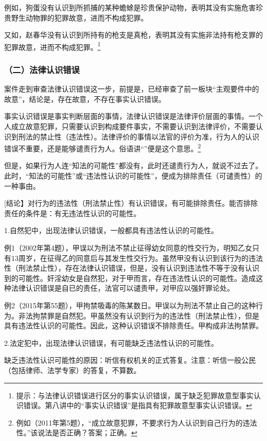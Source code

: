 例如，狗蛋没有认识到所抓捕的某种蟾蜍是珍贵保护动物，表明其没有实施危害珍贵野生动物罪的犯罪故意，进而不构成犯罪。

又如，赵春华没有认识到所持有的枪支是真枪，表明其没有实施非法持有枪支罪的犯罪故意，进而不构成犯罪。\footnote{提示：与法律认识错误进行区分的事实认识错误，属于缺乏犯罪故意型事实认识错误。第八讲中的“事实认识错误”是指具有犯罪故意型事实认识错误。}

\subsubsection*{（二）法律认识错误}

案件走到审查法律认识错误这一步，前提是，已经审查了前一板块“主观要件中的故意”，结论是，存在故意，不存在事实认识错误。

事实认识错误是事实判断层面的事情，法律认识错误是法律评价层面的事情。一个人成立故意犯罪，只需要认识到构成要件事实，不需要认识到法律评价，不需要认识到刑法的禁止性（违法性）。法律评价的事情以法官的评价为准，行为人的认识错误不重要，还是能够谴责行为人。俗语讲“”便是这个意思。\footnote{例如（2011年第5题），“成立故意犯罪，不要求行为人认识到自己行为的违法性。”该说法是否正确？答案；正确。}

但是，如果行为人连“知法的可能性”都没有，此时还谴责行为人，就说不过去了。此时，“知法的可能性”或“违法性认识的可能性”，便成为排除责任（可谴责性）的一种事由。

[结论】对行为的违法性（刑法禁止性）有认识错误，有可能排除责任。能否排除责任的条件是：有无违法性认识的可能性。

1.自然犯中，出现法律认识错误，一般都具有违法性认识的可能性。

例1（2002年第4题），甲误以为刑法不禁止征得幼女同意的性交行为，明知乙女只有13周岁，在征得乙的同意后与其发生性交行为。虽然甲没有认识到该行为的违法性（刑法禁止性），存在法律认识错误，但是，没有认识到违法性不等于没有认识到的可能性。奸淫幼女是自然犯，对于甲而言，存在违法性认识的可能性。造成这种法律认识错误是自已的责任，法官可以谴责甲，对甲应以强奸罪论处。

例2（2015年第55题），甲拘禁吸毒的陈某数日。甲误以为刑法不禁止自己的这种行为。非法拘禁罪是自然犯。甲虽然没有认识到行为的违法性（刑法禁止性），但是具有违法性认识的可能性。因此，这种认识错误不排除责任。甲构成非法拘禁罪。

2.法定犯中，出现法律认识错误，有可能缺乏违法性认识的可能性。

缺乏违法性认识可能性的原因：听信有权机关的正式答复。注意：听信一般公民（包括律师、法学专家）的答复，不算数。

